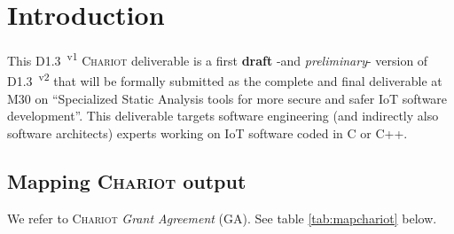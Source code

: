 \section{Introduction}
\label{sec:intro}

This D1.3~\textsuperscript{v1} \textsc{Chariot} deliverable is a first
\textbf{draft} -and \emph{preliminary}- version of
D1.3~\textsuperscript{v2} that will be formally submitted as the
complete and final deliverable at M30 on ``Specialized Static Analysis
tools for more secure and safer IoT software development''. This
deliverable targets software engineering (and indirectly also software
architects) experts working on IoT software coded in C or C++.

\subsection{Mapping \textsc{Chariot} output}
\label{subsec:mapchariot}

We refer to \textsc{Chariot} \emph{Grant Agreement} (GA). See table \ref{tab:mapchariot} below.


